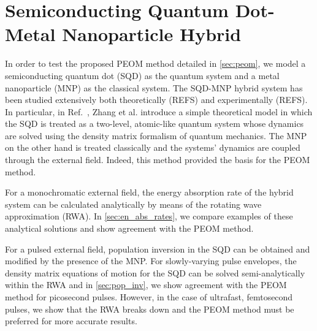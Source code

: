 \section{Semiconducting Quantum Dot-Metal Nanoparticle Hybrid}\label{sec:sqd-mnp}

In order to test the proposed PEOM method detailed in \cref{sec:peom}, we model a
semiconducting quantum dot (SQD) as the quantum  system and a metal
nanoparticle (MNP) as the classical  system. The SQD-MNP
hybrid system has been studied extensively both theoretically (REFS) and
experimentally (REFS). In particular, in Ref.~\cite{Zhang2006}, Zhang et al.
introduce a simple theoretical model in which the SQD is treated as a 
two-level, atomic-like quantum system whose dynamics are solved using the
density matrix formalism of quantum mechanics. The MNP on the other hand is
treated classically and the systems' dynamics are coupled through the external
field. Indeed, this method provided the basis for the PEOM method.

For a monochromatic external field, the energy absorption rate of the hybrid
system can be calculated analytically by means of the rotating wave
approximation (RWA). In \cref{sec:en_abs_rates}, we compare examples of these
analytical solutions and show agreement with the PEOM method.

For a pulsed external field, population inversion in the SQD can be obtained
and modified by the presence of the MNP. For slowly-varying pulse envelopes,
the density matrix equations of motion for the SQD can be solved
semi-analytically within the RWA and in \cref{sec:pop_inv}, we show agreement
with the PEOM method for picosecond pulses. However, in the case of ultrafast,
femtosecond pulses, we show that the RWA breaks down and the PEOM method must
be preferred for more accurate results.

